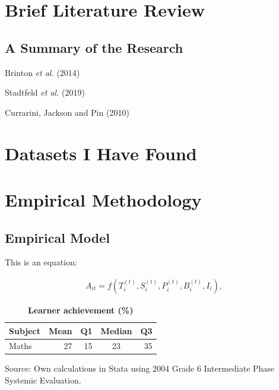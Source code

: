 \documentclass[11pt,preprint, authoryear]{article}
\numberwithin{equation}{section}
\numberwithin{figure}{section}
\numberwithin{table}{section}
\begin{document}
\newpage

\section{\texorpdfstring{Brief Literature Review
\label{Lit}}{Brief Literature Review }}\label{brief-literature-review}

\subsection{A Summary of the Research}\label{a-summary-of-the-research}

Brinton \emph{et al.} (2014)

Stadtfeld \emph{et al.} (2019)

Currarini, Jackson and Pin (2010)

\newpage

\section{\texorpdfstring{Datasets I Have Found
\label{Data}}{Datasets I Have Found }}\label{datasets-i-have-found}

\newpage

\section{\texorpdfstring{Empirical Methodology
\label{Meth}}{Empirical Methodology }}\label{empirical-methodology}

\subsection{\texorpdfstring{Empirical Model
\label{Model}}{Empirical Model }}\label{empirical-model}

This is an equation:

\begin{align} \label{eq:EP1}
A_{it}=f(T_i^{(t)},S_i^{(t)},P_i^{(t)},B_i^{(t)},I_i),
\end{align}

\footnotesize
\renewcommand{\thetable}{\arabic{table}}

\begin{longtable} {@{} l r r c r @{}} \caption{\textbf{Learner achievement (\%)}}
\label{tab:Dep}\\ \hline \hline
Subject & Mean & Q1 & Median & Q3 \\
\hline
Maths&      27& 15&   23&  35\\ \hline \hline
\end{longtable}\begin{center} Source: Own calculations in Stata using 2004 Grade 6 Intermediate Phase Systemic Evaluation.\end{center}
\end{document}
